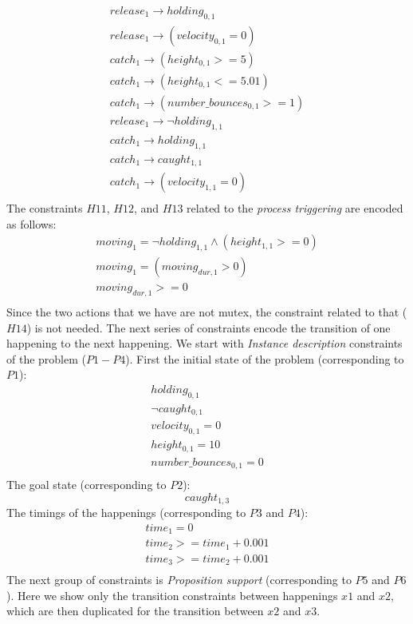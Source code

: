$$
\begin{array}{l}
release_{1} \rightarrow holding_{0,1}\\
release_{1} \rightarrow (velocity_{0,1} = 0)\\
catch_{1} \rightarrow (height_{0,1} >= 5)\\
catch_{1} \rightarrow (height_{0,1} <= 5.01)\\
catch_{1} \rightarrow (number\_bounces_{0,1} >= 1 )\\
release_{1} \rightarrow \neg holding_{1,1}\\
catch_{1} \rightarrow holding_{1,1}\\
catch_{1} \rightarrow caught_{1,1}\\
catch_{1} \rightarrow (velocity_{1,1} = 0)\\
\end{array}
$$
The constraints $H11$, $H12$, and $H13$ related to the \emph{process triggering} are encoded as follows:
$$
\begin{array}{l}
moving_{1} = \neg holding_{1,1} \wedge (height_{1,1} >= 0)\\
moving_{1} =  (moving_{dur,1} > 0)\\
moving_{dur,1} >= 0\\
\end{array}
$$
Since the two actions that we have are not mutex, the constraint related to that ($H14$) is not needed. The next series of constraints encode the transition of one happening to the next happening. We start with \emph{Instance description} constraints of the problem ($P1-P4$). First the initial state of the problem (corresponding to $P1$):
$$
\begin{array}{l}
holding_{0,1} \\
\neg caught_{0,1}\\
velocity_{0,1} = 0\\
height_{0,1} = 10\\
number\_bounces_{0,1} = 0\\
\end{array}
$$
The goal state (corresponding to $P2$):
$$
caught_{1,3}
$$
The timings of the happenings (corresponding to $P3$ and $P4$):
$$
\begin{array}{l}
time_1 = 0\\
time_2 >= time_1 + 0.001\\
time_3 >= time_2 + 0.001\\
\end{array}
$$
The next group of constraints is \emph{Proposition support} (corresponding to $P5$ and $P6$). Here we show only the transition constraints between happenings $x1$ and $x2$, which are then duplicated for the transition between $x2$ and $x3$.
